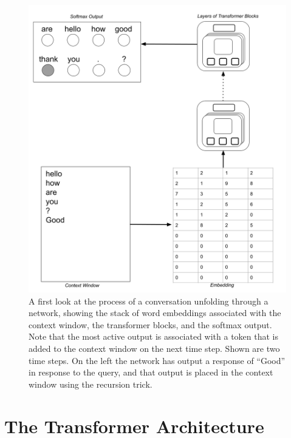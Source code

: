 \begin{figure}[h]
\includegraphics[scale=.2]{./images/TransformerOverview2.png}
\caption[Jeff Yoshimi]{A first look at the process of a conversation unfolding through a network, showing the stack of word embeddings associated with the context window, the transformer blocks, and the softmax output. Note that the most active output is associated with a token that is added to the context window on the next time step. Shown are two time steps. On the left the network has output a response of ``Good'' in response to the query, and that output is placed in the context window using the recursion trick.}
\label{transformerOverview}
\end{figure}

\section{The Transformer Architecture}\label{transformers}



